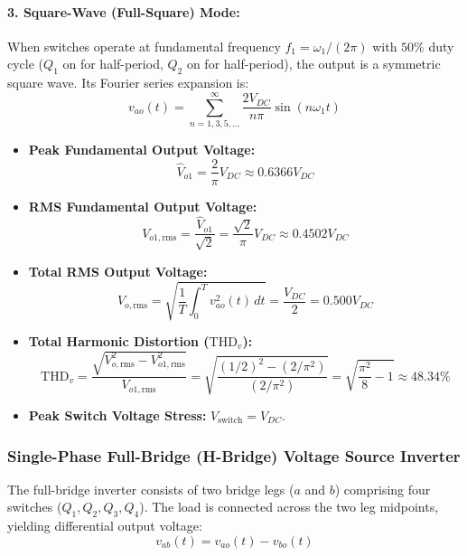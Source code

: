 \paragraph{3. Square-Wave (Full-Square) Mode:}
When switches operate at fundamental frequency $f_1 = \omega_1 / (2\pi)$ with $50\%$ duty cycle ($Q_1$ on for half-period, $Q_2$ on for half-period), the output is a symmetric square wave. Its Fourier series expansion is:
\begin{equation}
v_{ao}(t) = \sum_{n=1,3,5,\dots}^\infty \frac{2 V_{DC}}{n\pi} \sin(n\omega_1 t)
\end{equation}
\begin{itemize}
  \item \textbf{Peak Fundamental Output Voltage:}
  \begin{equation}
  \hat{V}_{o1} = \frac{2}{\pi} V_{DC} \approx 0.6366 V_{DC}
  \end{equation}
  \item \textbf{RMS Fundamental Output Voltage:}
  \begin{equation}
  V_{o1,\mathrm{rms}} = \frac{\hat{V}_{o1}}{\sqrt{2}} = \frac{\sqrt{2}}{\pi} V_{DC} \approx 0.4502 V_{DC}
  \end{equation}
  \item \textbf{Total RMS Output Voltage:}
  \begin{equation}
  V_{o,\mathrm{rms}} = \sqrt{\frac{1}{T}\int_0^T v_{ao}^2(t)\,dt} = \frac{V_{DC}}{2} = 0.500 V_{DC}
  \end{equation}
  \item \textbf{Total Harmonic Distortion ($\mathrm{THD}_v$):}
  \begin{equation}
  \mathrm{THD}_v = \frac{\sqrt{V_{o,\mathrm{rms}}^2 - V_{o1,\mathrm{rms}}^2}}{V_{o1,\mathrm{rms}}} = \sqrt{\frac{(1/2)^2 - (2/\pi^2)}{(2/\pi^2)}} = \sqrt{\frac{\pi^2}{8} - 1} \approx 48.34\%
  \end{equation}
  \item \textbf{Peak Switch Voltage Stress:} $V_{\mathrm{switch}} = V_{DC}$.
\end{itemize}

\subsubsection{Single-Phase Full-Bridge (H-Bridge) Voltage Source Inverter}
The full-bridge inverter consists of two bridge legs ($a$ and $b$) comprising four switches ($Q_1, Q_2, Q_3, Q_4$). The load is connected across the two leg midpoints, yielding differential output voltage:
\begin{equation}
v_{ab}(t) = v_{ao}(t) - v_{bo}(t)
\end{equation}

